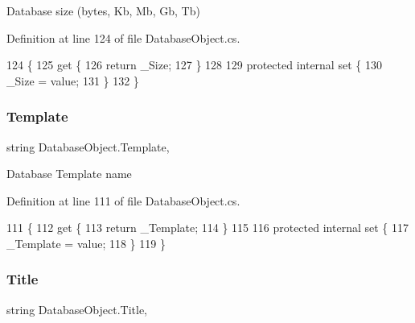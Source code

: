 Database size (bytes, Kb, Mb, Gb, Tb) 



Definition at line 124 of file Database\+Object.\+cs.


\begin{DoxyCode}
124                        \{
125         \textcolor{keyword}{get} \{
126             \textcolor{keywordflow}{return} \_Size;
127         \}
128 
129           \textcolor{keyword}{protected} \textcolor{keyword}{internal}  \textcolor{keyword}{set} \{
130             \_Size = value;
131         \}
132     \}
\end{DoxyCode}
\mbox{\label{class_database_object_ac8ecdbe9722c00f787a62aef7d3dfa5a}} 
\subsubsection{\texorpdfstring{Template}{Template}}
{\footnotesize\ttfamily string Database\+Object.\+Template\hspace{0.3cm}{\ttfamily [get]}, {\ttfamily [set]}}



Database Template name 



Definition at line 111 of file Database\+Object.\+cs.


\begin{DoxyCode}
111                            \{
112         \textcolor{keyword}{get} \{
113             \textcolor{keywordflow}{return} \_Template;
114         \}
115 
116         \textcolor{keyword}{protected} \textcolor{keyword}{internal} \textcolor{keyword}{set} \{
117             \_Template = value;
118         \}
119     \}
\end{DoxyCode}
\mbox{\label{class_database_object_a9af3f75274dd39f7fa82a355dc4ddf39}} 
\subsubsection{\texorpdfstring{Title}{Title}}
{\footnotesize\ttfamily string Database\+Object.\+Title\hspace{0.3cm}{\ttfamily [get]}, {\ttfamily [set]}}



